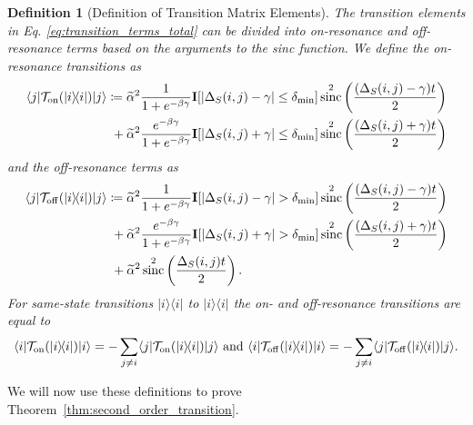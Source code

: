 \documentclass[
 amsmath,amssymb,
 aps,
onecolumn, 
nofootinbib]{revtex4-2}
\newtheorem{definition}[theorem]{Definition}
\newcommand{\on}{\rm on}
\newcommand{\off}{\rm off}
\newcommand{\ket}[1]{|#1\rangle}
\newcommand{\bra}[1]{\langle #1|}
\newcommand{\ketbra}[2]{| #1\rangle\! \langle #2|}
\newcommand{\TT}{\mathcal{T}}
\DeclareMathOperator{\sinc}{sinc}
\begin{document}
\begin{definition}[Definition of Transition Matrix Elements]\label{def:transition}
The transition elements in Eq. \eqref{eq:transition_terms_total} can be divided into on-resonance and off-resonance terms based on the arguments to the sinc function. We define the on-resonance transitions as
\begin{align}
    \bra{j} \TT_{\on}(\ketbra{i}{i})\ket{j} &\coloneqq \widetilde{\alpha}^2 \frac{1}{1 + e^{-\beta \gamma}} \mathbf{I}[|\Delta_S(i,j) - \gamma| \le \delta_{\min}]  \sinc^2\left(\frac{(\Delta_S(i,j) - \gamma)t}{2}\right) \nonumber \\
    &~+ \widetilde{\alpha}^2 \frac{e^{-\beta \gamma}}{1 + e^{-\beta \gamma}} \mathbf{I}[|\Delta_S(i,j) + \gamma| \le \delta_{\min}]  \sinc^2\left(\frac{(\Delta_S(i,j) + \gamma)t}{2}\right) \label{eq:on_resonance}
\end{align}
and the off-resonance terms as
\begin{equation}
\begin{split}
    \bra{j} \TT_{\off}(\ketbra{i}{i})\ket{j} &\coloneqq \widetilde{\alpha}^2 \frac{1}{1 + e^{-\beta \gamma}} \mathbf{I}[|\Delta_S(i,j) - \gamma| > \delta_{\min}]  \sinc^2\left(\frac{(\Delta_S(i,j) - \gamma)t}{2}\right)  \\
    &~+ \widetilde{\alpha}^2 \frac{e^{-\beta \gamma}}{1 + e^{-\beta \gamma}} \mathbf{I}[|\Delta_S(i,j) + \gamma| > \delta_{\min}]  \sinc^2\left(\frac{(\Delta_S(i,j) + \gamma)t}{2}\right)  \\
    &~+ \widetilde{\alpha}^2 \sinc^2 \left( \frac{\Delta_S(i,j)t}{2} \right). \label{eq:off_resonance}
    \end{split}
\end{equation}
For same-state transitions $\ketbra{i}{i}$ to $\ketbra{i}{i}$ the on- and off-resonance transitions are equal to
\begin{equation}
    \bra{i} \TT_{\on}(\ketbra{i}{i}) \ket{i} = - \sum_{j \neq i}\bra{j} \TT_{\on}(\ketbra{i}{i}) \ket{j} \text{ and } \bra{i} \TT_{\off}(\ketbra{i}{i}) \ket{i} = - \sum_{j \neq i}\bra{j} \TT_{\off}(\ketbra{i}{i}) \ket{j}. \label{eq:same_state_transition_resonances}
\end{equation}
\end{definition}
We will now use these definitions to prove Theorem~\ref{thm:second_order_transition}.
\end{document}
